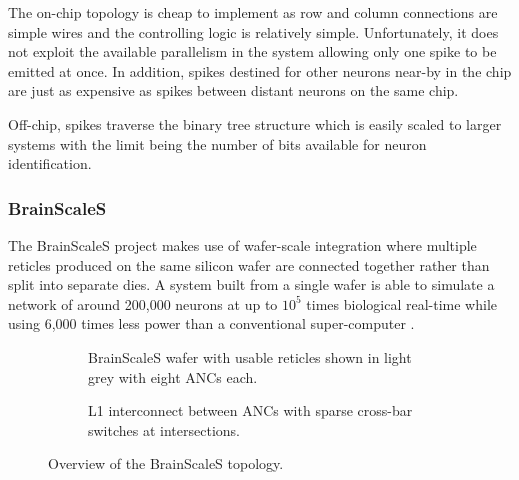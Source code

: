 				The on-chip topology is cheap to implement as row and column connections
				are simple wires and the controlling logic is relatively simple.
				Unfortunately, it does not exploit the available parallelism in the
				system allowing only one spike to be emitted at once. In addition,
				spikes destined for other neurons near-by in the chip are just as
				expensive as spikes between distant neurons on the same chip.
				
				Off-chip, spikes traverse the binary tree structure which is easily
				scaled to larger systems with the limit being the number of bits
				available for neuron identification.
			
			\subsubsection{BrainScaleS}
				
				
				The BrainScaleS project makes use of wafer-scale integration where
				multiple reticles produced on the same silicon wafer are connected together
				rather than split into separate dies. A system built from a single wafer
				is able to simulate a network of around 200,000 neurons at up to $10^5$
				times biological real-time while using 6,000 times less power than a
				conventional super-computer \cite{schemmel08}.
				
				\begin{figure}
					\center
					\begin{subfigure}[b]{0.45\textwidth}
						\center
						
						\caption{BrainScaleS wafer with usable reticles shown in light
						grey with eight ANCs each.}
						\label{fig:brainscales-wafer}
					\end{subfigure}
					\hspace{1ex}
					\begin{subfigure}[b]{0.45\textwidth}
						\center
						
						\caption{L1 interconnect between ANCs with sparse cross-bar
						switches at intersections.}
						\label{fig:brainscales-l1}
					\end{subfigure}
					
					\caption{Overview of the BrainScaleS topology.}
					\label{fig:brainscales-topology}
				\end{figure}
				
